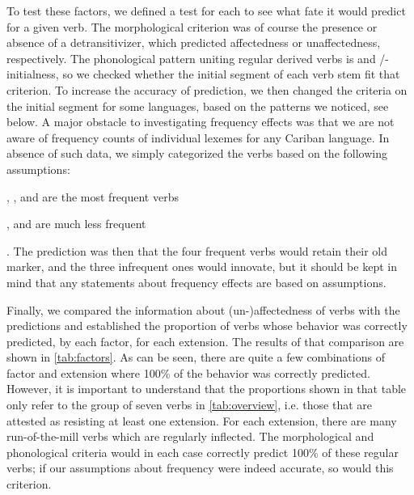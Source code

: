 To test these factors, we defined a test for each to see what fate it would predict for a given verb.
The morphological criterion was of course the presence or absence of a detransitivizer, which predicted affectedness or unaffectedness, respectively.
The phonological pattern uniting regular derived  verbs is  and /-initialness, so we checked whether the initial segment of each verb stem fit that criterion.
To increase the accuracy of prediction, we then changed the criteria on the initial segment for some languages, based on the patterns we noticed, see below.
A major obstacle to investigating frequency effects was that we are not aware of frequency counts of individual lexemes for any Cariban language.
In absence of such data, we simply categorized the verbs based on the following assumptions:
\begin{inlinelist}
	\item {}, , and  are the most frequent  verbs
	\item {},  and  are much less frequent
\end{inlinelist}.
The prediction was then that the four frequent verbs would retain their old marker, and the three infrequent ones would innovate, but it should be kept in mind that any statements about frequency effects are based on assumptions.

Finally, we compared the information about (un-)affectedness of verbs  with the predictions and established the proportion of verbs whose behavior was correctly predicted, by each factor, for each extension.
The results of that comparison are shown in \cref{tab:factors}.
As can be seen, there are quite a few combinations of factor and extension where 100\% of the behavior was correctly predicted.
However, it is important to understand that the proportions shown in that table only refer to the group of seven verbs in \cref{tab:overview}, i.e. those that are attested as resisting at least one extension.
For each extension, there are many run-of-the-mill  verbs which are regularly inflected.
The morphological and phonological criteria would in each case correctly predict 100\% of these regular verbs; if our assumptions about frequency were indeed accurate, so would this criterion.





